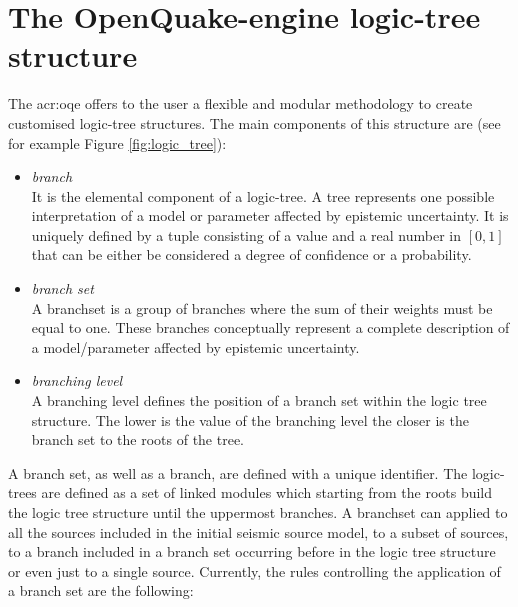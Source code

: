 \section{The OpenQuake-engine logic-tree structure}
\label{sec:lr_intro}
The \gls{acr:oqe}  offers to the user a flexible and modular methodology 
to create customised logic-tree structures. 
%
The main components of this structure are (see for example Figure 
\ref{fig:logic_tree}):
%
\begin{itemize}
    \item \emph{branch} \hfill \\
        It is the elemental component of a logic-tree. A tree
        represents one possible interpretation of a model or parameter 
        affected by epistemic uncertainty. It is uniquely defined by a tuple
        consisting of a value and a real number in $[0,1]$ that can be either
        be considered a degree of confidence or a probability.
    \item \emph{branch set} \hfill \\
        A \gls{branchset} is a group of branches where the sum
        of their weights must be equal to one. These branches conceptually 
        represent a complete description of a model/parameter affected by 
        epistemic uncertainty. 
    \item \emph{branching level} \hfill \\
        A branching level defines the position of a 
        branch set within the logic tree structure. The lower is the value of
        the branching level the closer is the branch set to the roots of 
        the tree.
\end{itemize}
A branch set, as well as a \gls{branch}, are defined with a unique 
identifier. 
%
The logic-trees are defined as a set of linked modules which starting from the 
roots build the logic tree structure until the uppermost branches. 
%
A \gls{branchset} can applied to all the sources included in the initial 
seismic source model, to a subset of sources, to a branch included in a 
branch set occurring before in the logic tree structure or even just to 
a single source. Currently, the rules controlling the application of a 
branch set are the following:
